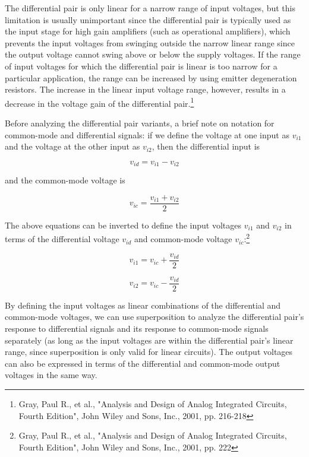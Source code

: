 \par
The differential pair is only linear for a narrow range of input voltages, but this limitation is usually unimportant since the differential pair is typically used as the input stage for high gain amplifiers (such as operational amplifiers), which prevents the input voltages from swinging outside the narrow linear range since the output voltage cannot swing above or below the supply voltages. If the range of input voltages for which the differential pair is linear is too narrow for a particular application, the range can be increased by using emitter degeneration resistors. The increase in the linear input voltage range, however, results in a decrease in the voltage gain of the differential pair.\footnote{Gray, Paul R., et al., "Analysis and Design of Analog Integrated Circuits, Fourth Edition", John Wiley and Sons, Inc., 2001, pp. 216-218}
\par
Before analyzing the differential pair variants, a brief note on notation for common-mode and differential signals: if we define the voltage at one input as $v_{i1}$ and the voltage at the other input as $v_{i2}$, then the differential input is

\begin{equation}
v_{id} = v_{i1}-v_{i2}
\end{equation}

\noindent and the common-mode voltage is

\begin{equation}
v_{ic} = \frac{v_{i1}+v_{i2}}{2}
\end{equation}

\noindent The above equations can be inverted to define the input voltages $v_{i1}$ and $v_{i2}$ in terms of the differential voltage $v_{id}$ and common-mode voltage $v_{ic}$:\footnote{Gray, Paul R., et al., "Analysis and Design of Analog Integrated Circuits, Fourth Edition", John Wiley and Sons, Inc., 2001, pp. 222}

\begin{equation}
v_{i1} = v_{ic}+\frac{v_{id}}{2}
\end{equation}

\begin{equation}
v_{i2} = v_{ic}-\frac{v_{id}}{2}
\end{equation}

By defining the input voltages as linear combinations of the differential and common-mode voltages, we can use superposition to analyze the differential pair's response to differential signals and its response to common-mode signals separately (as long as the input voltages are within the differential pair's linear range, since superposition is only valid for linear circuits). The output voltages can also be expressed in terms of the differential and common-mode output voltages in the same way.

